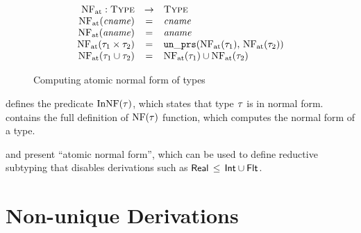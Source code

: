 \begin{figure}
	\[
	\begin{array}{rcl}
	\mathop{\mathrm{NF}_{\mathrm{at}}}: \textsc{Type} &\rightarrow& \textsc{Type} \\
	\mathop{\mathrm{NF}_{\mathrm{at}}}(\mathit{cname}) &=& \mathit{cname} \\
	\mathop{\mathrm{NF}_{\mathrm{at}}}(\mathit{aname}) &=& \mathit{aname} \\
	\mathop{\mathrm{NF}_{\mathrm{at}}}(\tau_1 \times \tau_2) &=& \mathop{\mathtt{un\_prs}}(\mathop{\mathrm{NF}_{\mathrm{at}}}(\tau_1), \, \mathop{\mathrm{NF}_{\mathrm{at}}}(\tau_2))	\\
	\mathop{\mathrm{NF}_{\mathrm{at}}}(\tau_1 \cup \tau_2) &=& \mathop{\mathrm{NF}_{\mathrm{at}}}(\tau_1) \cup \mathop{\mathrm{NF}_{\mathrm{at}}}(\tau_2) \\
	\end{array}
	\]
	\caption{Computing atomic normal form of \BetaJulia types}
	\label{fig:bjnom-calc-nf-full}
\end{figure}

 defines the predicate $\mathop{\mathrm{InNF}}(\tau)$, which states
that type $\tau$ is in normal form.
 contains the full definition of $\mathop{\mathrm{NF}}(\tau)$ 
function, which computes the normal form of a type.

 and  present 
``atomic normal form'', which can be used to define reductive subtyping
that disables derivations such as $\mathsf{Real} \, \leq \, \mathsf{Int} \cup \mathsf{Flt}$.

\section{Non-unique Derivations}\label{app:example-deriv}

